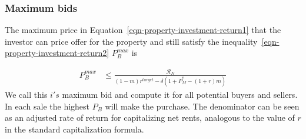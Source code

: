 % 
% 
% 

\subsubsection{Maximum bids}
The maximum price in Equation~\ref{eqn-property-investment-return1} that the investor can price offer for the property  and still satisfy the inequality~\ref{eqn-property-investment-return2} $P_B^{max}$ is

\begin{eqnarray}
P_B^{max} & \le    \frac{\mathcal{R}_N}{(1-m)r^{target}-\delta \left(1 + \dot P_M^e - (1+r)m\right)} \label{equation-Bidprice}\end{eqnarray}
We call this  $i's$ maximum bid and compute it for all potential buyers and sellers. In each sale the highest $P_B$ will make the purchase. The denominator can be seen as an adjusted rate of return for capitalizing net rents, analogous to the value of $r$ in  the standard capitalization formula.

